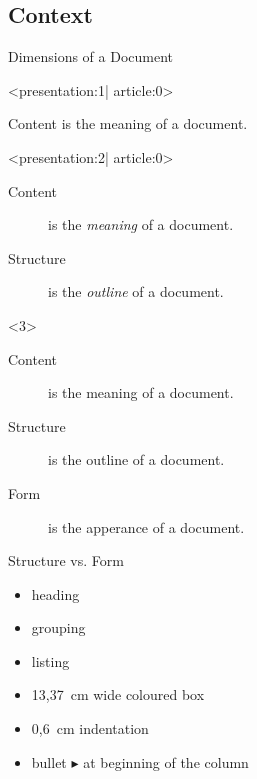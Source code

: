 
\subsection{Context}

\begin{frame}{Dimensions of a Document}
  \begin{onlyenv}<presentation:1| article:0>
    \begin{center}
      Content is the meaning of a document.
    \end{center}
  \end{onlyenv}
  \begin{onlyenv}<presentation:2| article:0>
    \begin{description}
      \item[\textnormal{\color{black}Content}] is the \emph{meaning} of a document.
      \item[\textnormal{\color{black}Structure}] is the \emph{outline }  of a document.
    \end{description}
  \end{onlyenv}
  \begin{onlyenv}<3>
    \begin{description}
      \item[Content] is the \alert{meaning}  of a document.
      \item[Structure] is the \alert{outline}  of a document.
      \item[Form] is the \alert{apperance} of a document.
    \end{description}
  \end{onlyenv}
\end{frame}

\begin{frame}{Structure vs. Form}
  \begin{Example}[Structure]
    \begin{itemize}
      \item heading
      \item grouping
      \item listing
    \end{itemize}
  \end{Example}

  \xxx

  \begin{Example}[Form]
    \begin{itemize}
      \item 13{,}37~cm wide coloured box
      \item 0{,}6~cm indentation
      \item bullet $\blacktriangleright$ at beginning of the column
    \end{itemize}
  \end{Example}
\end{frame}

